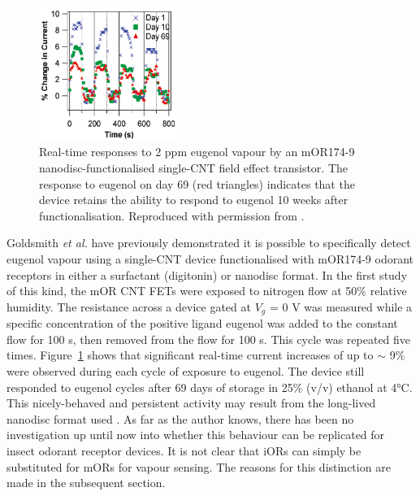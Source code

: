 \documentclass[
  a4paper,
]{scrbook}
\begin{document}
\begin{figure}

{\centering \includegraphics[width=0.4\textwidth,height=\textheight]{figures/ch3/eugenol.png}

}

\caption{\label{fig-eugenol-responses}Real-time responses to 2 ppm
eugenol vapour by an mOR174-9 nanodisc-functionalised single-CNT field
effect transistor. The response to eugenol on day 69 (red triangles)
indicates that the device retains the ability to respond to eugenol 10
weeks after functionalisation. Reproduced with permission from
\autocite{Goldsmith2011}.}

\end{figure}

Goldsmith \emph{et al.} have previously demonstrated it is possible to
specifically detect eugenol vapour using a single-CNT device
functionalised with mOR174-9 odorant receptors in either a surfactant
(digitonin) or nanodisc format. In the first study of this kind, the mOR
CNT FETs were exposed to nitrogen flow at 50\% relative humidity. The
resistance across a device gated at \(V_g\) = 0 V was measured while a
specific concentration of the positive ligand eugenol was added to the
constant flow for 100 s, then removed from the flow for 100 s. This
cycle was repeated five times. Figure~\ref{fig-eugenol-responses} shows
that significant real-time current increases of up to \(\sim\) 9\% were
observed during each cycle of exposure to eugenol. The device still
responded to eugenol cycles after 69 days of storage in 25\% (v/v)
ethanol at 4°C. This nicely-behaved and persistent activity may result
from the long-lived nanodisc format used \autocite{Goldsmith2011}. As
far as the author knows, there has been no investigation up until now
into whether this behaviour can be replicated for insect odorant
receptor devices. It is not clear that iORs can simply be substituted
for mORs for vapour sensing. The reasons for this distinction are made
in the subsequent section.
\end{document}
